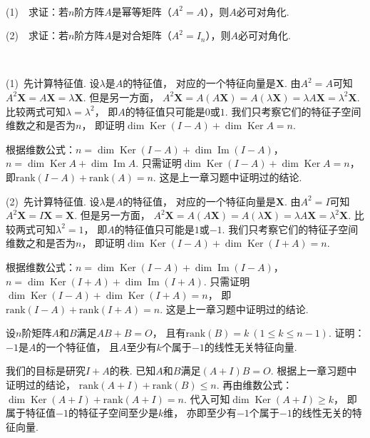 \begin{example}
    ~

    (1)~~求证：若$n$阶方阵$A$是幂等矩阵（$A^2 = A$），则$A$必可对角化.

    (2)~~求证：若$n$阶方阵$A$是对合矩阵（$A^2 = I_n$），则$A$必可对角化.
\end{example}
\smallskip
\begin{pf}
    ~

    (1)~先计算特征值.
    设$\lambda$是$A$的特征值，
    对应的一个特征向量是$\bm{X}$.
    由$A^2 = A$可知$A^2 \bm{X} = A \bm{X} = \lambda \bm{X}$.
    但是另一方面，
    $A^2 \bm{X} = A (A \bm{X}) = A (\lambda \bm{X}) = \lambda A \bm{X} = \lambda^2 \bm{X}$.
    比较两式可知$\lambda = \lambda^2$，
    即$A$的特征值只可能是$0$或$1$.
    我们只考察它们的特征子空间维数之和是否为$n$，
    即证明$\dim \operatorname{Ker}(I - A) + \dim \operatorname{Ker} A = n$.

    根据维数公式：$n = \dim \operatorname{Ker}(I - A) + \dim \operatorname{Im}(I - A)$，
    $n = \dim \operatorname{Ker}A + \dim \operatorname{Im}A$.
    只需证明$\dim \operatorname{Ker}(I - A) + \dim \operatorname{Ker}A = n$，
    即$\mathrm{rank}(I-A) + \mathrm{rank}(A) = n$.
    这是上一章习题中证明过的结论.

    \medskip

    (2)~先计算特征值.
    设$\lambda$是$A$的特征值，
    对应的一个特征向量是$\bm{X}$.
    由$A^2 = I$可知$A^2 \bm{X} = I \bm{X} = \bm{X}$.
    但是另一方面，
    $A^2 \bm{X} = A (A \bm{X}) = A (\lambda \bm{X}) = \lambda A \bm{X} = \lambda^2 \bm{X}$.
    比较两式可知$\lambda^2 = 1$，
    即$A$的特征值只可能是$1$或$-1$.
    我们只考察它们的特征子空间维数之和是否为$n$，
    即证明$\dim \operatorname{Ker}(I - A) + \dim \operatorname{Ker} (I+A) = n$.

    根据维数公式：$n = \dim \operatorname{Ker}(I - A) + \dim \operatorname{Im}(I - A)$，
    $n = \dim \operatorname{Ker}(I+A) + \dim \operatorname{Im}(I+A)$.
    只需证明$\dim \operatorname{Ker}(I - A) + \dim \operatorname{Ker}(I+A) = n$，
    即$\mathrm{rank}(I-A) + \mathrm{rank}(I+A) = n$.
    这是上一章习题中证明过的结论.
\end{pf}

\bigskip

\begin{example}
    设$n$阶矩阵$A$和$B$满足$AB+B=O$，
    且有$\mathrm{rank}(B) = k~(1 \leq k \leq n-1)$.
    证明：$-1$是$A$的一个特征值，
    且$A$至少有$k$个属于$-1$的线性无关特征向量.
\end{example}
\smallskip
\begin{pf}
    我们的目标是研究$I+A$的秩.
    已知$A$和$B$满足$(A+I)B = O$.
    根据上一章习题中证明过的结论，
    $\mathrm{rank}(A+I) + \mathrm{rank}(B) \leq n$.
    再由维数公式：$\dim \operatorname{Ker} (A+I) + \mathrm{rank}(A+I) = n$.
    代入可知$\dim \operatorname{Ker} (A+I) \geq k$，
    即属于特征值$-1$的特征子空间至少是$k$维，
    亦即至少有$-1$个属于$-1$的线性无关的特征向量.
\end{pf}

